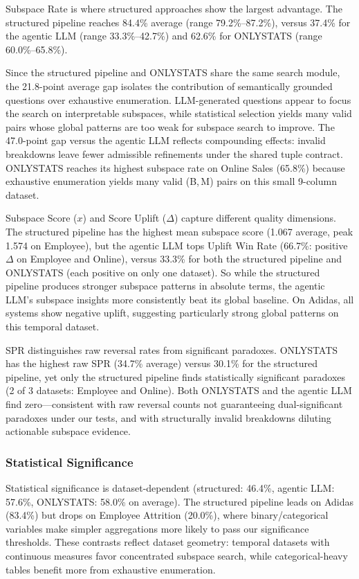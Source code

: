 \documentclass[conference]{IEEEtran}
\begin{document}
Subspace Rate is where structured approaches show the largest advantage. The structured pipeline reaches 84.4\% average (range 79.2\%--87.2\%), versus 37.4\% for the agentic LLM (range 33.3\%--42.7\%) and 62.6\% for ONLYSTATS (range 60.0\%--65.8\%).

Since the structured pipeline and ONLYSTATS share the same search module, the 21.8-point average gap isolates the contribution of semantically grounded questions over exhaustive enumeration. LLM-generated questions appear to focus the search on interpretable subspaces, while statistical selection yields many valid pairs whose global patterns are too weak for subspace search to improve. The 47.0-point gap versus the agentic LLM reflects compounding effects: invalid breakdowns leave fewer admissible refinements under the shared tuple contract. ONLYSTATS reaches its highest subspace rate on Online Sales (65.8\%) because exhaustive enumeration yields many valid (B,\,M) pairs on this small 9-column dataset.

Subspace Score ($x$) and Score Uplift ($\Delta$) capture different quality dimensions. The structured pipeline has the highest mean subspace score (1.067 average, peak 1.574 on Employee), but the agentic LLM tops Uplift Win Rate (66.7\%: positive $\Delta$ on Employee and Online), versus 33.3\% for both the structured pipeline and ONLYSTATS (each positive on only one dataset). So while the structured pipeline produces stronger subspace patterns in absolute terms, the agentic LLM's subspace insights more consistently beat its global baseline. On Adidas, all systems show negative uplift, suggesting particularly strong global patterns on this temporal dataset.

SPR distinguishes raw reversal rates from significant paradoxes. ONLYSTATS has the highest raw SPR (34.7\% average) versus 30.1\% for the structured pipeline, yet only the structured pipeline finds statistically significant paradoxes (2 of 3 datasets: Employee and Online). Both ONLYSTATS and the agentic LLM find zero---consistent with raw reversal counts not guaranteeing dual-significant paradoxes under our tests, and with structurally invalid breakdowns diluting actionable subspace evidence.

\subsubsection{Statistical Significance}

Statistical significance is dataset-dependent (structured: 46.4\%, agentic LLM: 57.6\%, ONLYSTATS: 58.0\% on average). The structured pipeline leads on Adidas (83.4\%) but drops on Employee Attrition (20.0\%), where binary/categorical variables make simpler aggregations more likely to pass our significance thresholds. These contrasts reflect dataset geometry: temporal datasets with continuous measures favor concentrated subspace search, while categorical-heavy tables benefit more from exhaustive enumeration.
\end{document}
